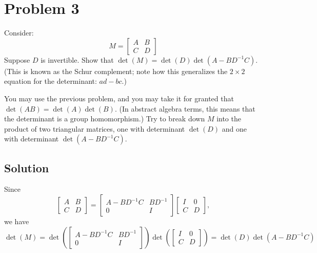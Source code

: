 \documentclass[11pt]{report}
\theoremstyle{definition}
\newcommand{\xlr}[2]{#1 \left(#2\right)}
\begin{document}
\section*{Problem 3}
Consider:
\[
M =
\begin{bmatrix}
A & B \\
C & D
\end{bmatrix}
\]
Suppose $D$ is invertible. Show that $\det(M) = \det(D) \det(A-BD^{-1}C)$. (This is known as the Schur complement; note how this generalizes the $2 \times 2$ equation for the determinant: $ad - bc$.)

 You may use the previous problem, and you may take it for granted that $\det(AB) = \det(A) \det(B)$. (In abstract algebra terms, this means that the determinant is a group homomorphism.) Try to break down $M$ into the product of two triangular matrices, one with determinant $\xlr{\det}{D}$ and one with determinant $\xlr{\det}{A - B D^{-1} C }$.

\subsection*{Solution}
Since $$ \begin{bmatrix} A & B \\ C & D \end{bmatrix} = \begin{bmatrix}
A-BD^{-1}C & BD^{-1} \\ 0 & I \end{bmatrix} \begin{bmatrix} I & 0 \\ C & D \end{bmatrix},$$ we have $\det(M) = \det(\begin{bmatrix}
A-BD^{-1}C & BD^{-1} \\ 0 & I \end{bmatrix}) \det(\begin{bmatrix} I & 0 \\ C & D \end{bmatrix}) = \det(D) \det(A-BD^{-1}C)$

\end{document}
